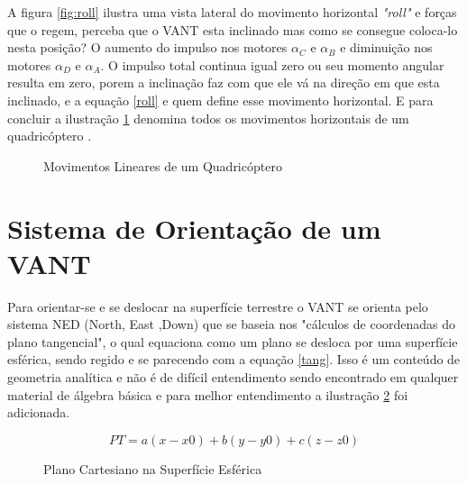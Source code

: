 A figura \ref{fig:roll} ilustra uma vista lateral do movimento horizontal \textit{"roll"} e forças que o regem, perceba que o VANT esta inclinado mas como se consegue coloca-lo nesta posição? O aumento do impulso nos motores $\alpha_{C}$ e $\alpha_{B}$ e diminuição nos motores $\alpha_{D}$ e $\alpha_{A}$. O impulso total continua igual zero ou seu momento angular resulta em zero, porem a inclinação faz com que ele vá na direção em que esta inclinado, e a equação \ref{roll} e quem define esse movimento horizontal.
E para concluir a ilustração \ref{fig:dirdrone} denomina todos os movimentos horizontais de um quadricóptero \cite{calcmov}.  

\begin{figure}[H]
	\centering
	\caption{Movimentos Lineares de um Quadricóptero}
	\fontsize{9pt}{12pt}\selectfont
	\def\svgwidth{15cm}
	
	\label{fig:dirdrone}
\end{figure}

\section{Sistema de Orientação de um VANT}

Para orientar-se e se deslocar na superfície terrestre o VANT se orienta pelo sistema NED (North, East ,Down) que se baseia nos "cálculos de coordenadas do plano tangencial", o qual equaciona como um plano se desloca por uma superfície esférica, sendo regido e se parecendo com a equação \ref{tang}. Isso é um conteúdo de geometria analítica e não é de difícil entendimento sendo encontrado em qualquer material de álgebra básica e para melhor entendimento a ilustração \ref{fig:planacart} foi adicionada.  

\begin{equation}
	\label{tang}
	PT=a\left(x-x0\right)+b\left(y-y0\right)+c\left(z-z0\right)
\end{equation}

\begin{figure}[H]
	\centering
	\caption{Plano Cartesiano na Superfície Esférica}
	\fontsize{9pt}{12pt}\selectfont
	\color{black}
	\def\svgwidth{15cm}
	
	\label{fig:planacart}
\end{figure}

